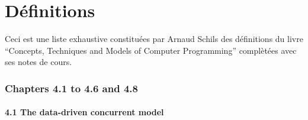 \part{Définitions}
Ceci est une liste exhaustive constituées par Arnaud Schils
des définitions du livre
``Concepts, Techniques and Models of Computer Programming''
complètées avec ses notes de cours.

\section{Chapters 4.1 to 4.6 and 4.8}

\subsection{4.1 The data-driven concurrent model}

